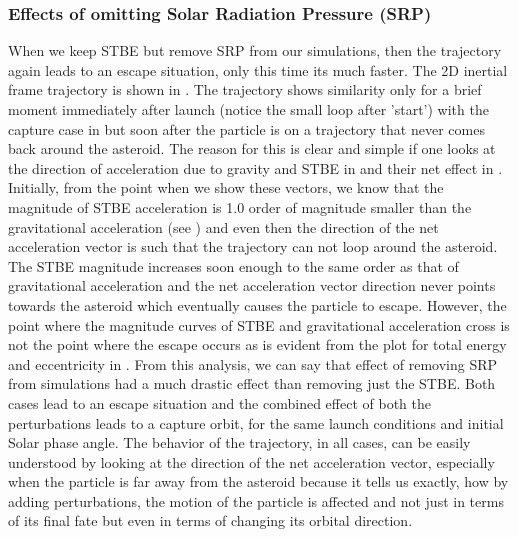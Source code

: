 \subsubsection{Effects of omitting Solar Radiation Pressure (SRP)}
When we keep \gls{STBE} but remove \gls{SRP} from our simulations, then the trajectory again leads to an escape situation, only this time its much faster. The 2D inertial frame trajectory is shown in . The trajectory shows similarity only for a brief moment immediately after launch (notice the small loop after 'start') with the capture case in  but soon after the particle is on a trajectory that never comes back around the asteroid. The reason for this is clear and simple if one looks at the direction of acceleration due to gravity and \gls{STBE} in  and their net effect in . Initially, from the point when we show these vectors, we know that the magnitude of \gls{STBE} acceleration is 1.0 order of magnitude smaller than the gravitational acceleration (see ) and even then the direction of the net acceleration vector is such that the trajectory can not loop around the asteroid. The \gls{STBE} magnitude increases soon enough to the same order as that of gravitational acceleration and the net acceleration vector direction never points towards the asteroid which eventually causes the particle to escape. However, the point where the magnitude curves of \gls{STBE} and gravitational acceleration cross is not the point where the escape occurs as is evident from the plot for total energy and eccentricity in .
%
\newline\newline
%
From this analysis, we can say that effect of removing \gls{SRP} from simulations had a much drastic effect than removing just the \gls{STBE}. Both cases lead to an escape situation and the combined effect of both the perturbations leads to a capture orbit, for the same launch conditions and initial Solar phase angle. The behavior of the trajectory, in all cases, can be easily understood by looking at the direction of the net acceleration vector, especially when the particle is far away from the asteroid because it tells us exactly, how by adding perturbations, the motion of the particle is affected and not just in terms of its final fate but even in terms of changing its orbital direction.

